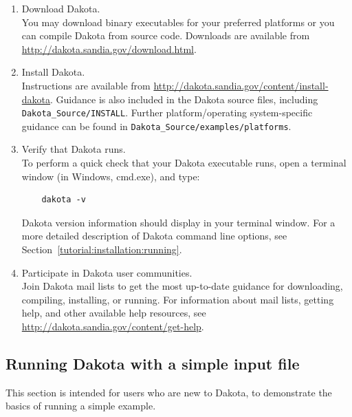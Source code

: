 \begin{enumerate}
  \item Download Dakota. \\
    You may download binary executables for your preferred platforms or 
    you can compile Dakota from source code. Downloads are available from 
    \url{http://dakota.sandia.gov/download.html}.
    
  \item Install Dakota. \\
    Instructions are available from 
    \url{http://dakota.sandia.gov/content/install-dakota}. Guidance is also 
    included in the Dakota source files, including
    \texttt{Dakota\_Source/INSTALL}. Further platform/operating system-specific
    guidance can be found in {\tt Dakota\_Source/examples/platforms}.

  \item Verify that Dakota runs. \\
    To perform a quick check that your Dakota executable runs, open a 
    terminal window (in Windows, cmd.exe), and type: \\
    \vspace{-2em}
    \begin{small}
    \begin{verbatim}
    dakota -v
    \end{verbatim}
      \end{small}
    \vspace{-2em}
    Dakota version information should display in your terminal window.
    For a more detailed description of Dakota command line options, see
    Section~\ref{tutorial:installation:running}.

  \item Participate in Dakota user communities. \\
    Join Dakota mail lists to get the most up-to-date guidance for
    downloading, compiling, installing, or running. For information about
    mail lists, getting help, and other available help resources, see \\
    \url{http://dakota.sandia.gov/content/get-help}.

\end{enumerate}

\subsection{Running Dakota with a simple input file}\label{tutorial:quickstart:running}
This section is intended for users who are new to Dakota, to demonstrate the basics 
of running a simple example. 

